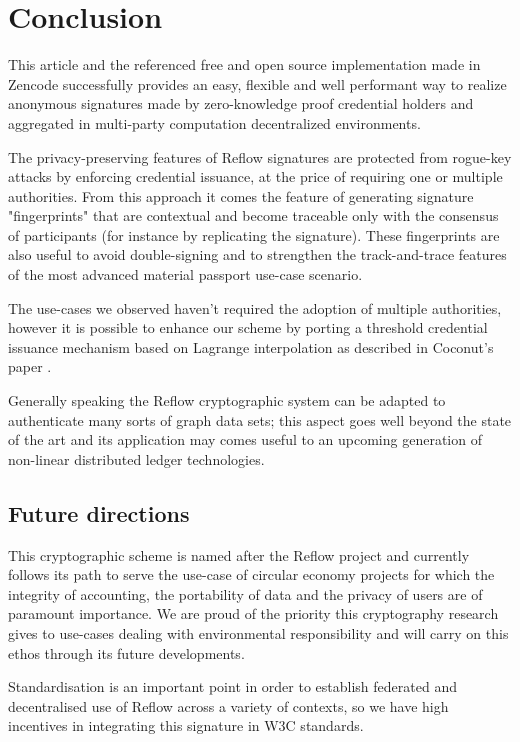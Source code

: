 \documentclass[twocolumn]{article}
\begin{document}
\twocolumn

\section{Conclusion}

This article and the referenced free and open source implementation
made in Zencode successfully provides an easy, flexible and well
performant way to realize anonymous signatures made by zero-knowledge
proof credential holders and aggregated in multi-party computation
decentralized environments.

The privacy-preserving features of Reflow signatures are protected
from rogue-key attacks by enforcing credential issuance, at the price
of requiring one or multiple authorities. From this approach it comes
the feature of generating signature "fingerprints" that are contextual
and become traceable only with the consensus of participants (for
instance by replicating the signature). These fingerprints are also
useful to avoid double-signing and to strengthen the track-and-trace
features of the most advanced material passport use-case scenario.

The use-cases we observed haven't required the adoption of multiple
authorities, however it is possible to enhance our scheme by porting a
threshold credential issuance mechanism based on Lagrange
interpolation as described in Coconut's paper \citep{coconut-2018}.

Generally speaking the Reflow cryptographic system can be adapted to
authenticate many sorts of graph data sets; this aspect goes well
beyond the state of the art and its application may comes useful to an
upcoming generation of non-linear distributed ledger technologies.

\subsection{Future directions}

This cryptographic scheme is named after the Reflow project and currently
follows its path to serve the use-case of circular economy projects
for which the integrity of accounting, the portability of data and the
privacy of users are of paramount importance. We are proud of the
priority this cryptography research gives to use-cases dealing with
environmental responsibility and will carry on this ethos through its
future developments.

Standardisation is an important point in order to establish federated
and decentralised use of Reflow across a variety of contexts, so we
have high incentives in integrating this signature in W3C standards.
\end{document}
